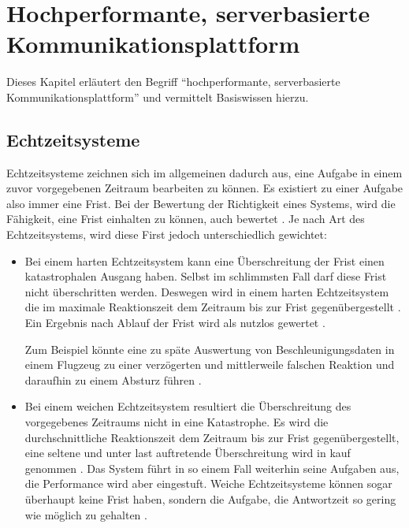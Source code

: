 
\chapter{Hochperformante, serverbasierte Kommunikationsplattform}
\label{com_plattform}

Dieses Kapitel erläutert den Begriff \enquote{hochperformante, serverbasierte Kommunikationsplattform} und vermittelt Basiswissen hierzu.

\section{Echtzeitsysteme}
Echtzeitsysteme zeichnen sich im allgemeinen dadurch aus, eine Aufgabe in einem zuvor vorgegebenen Zeitraum bearbeiten zu können.
Es existiert zu einer Aufgabe also immer eine Frist.
Bei der Bewertung der Richtigkeit eines Systems, wird die Fähigkeit, eine Frist einhalten zu können, auch bewertet \cite[2]{perf:buttazzo2006soft}.
Je nach Art des Echtzeitsystems, wird diese First jedoch unterschiedlich gewichtet:

\begin{itemize}
	\item Bei einem harten Echtzeitsystem kann eine Überschreitung der Frist einen katastrophalen Ausgang haben.
	Selbst im schlimmsten Fall darf diese Frist nicht überschritten werden.
	Deswegen wird in einem harten Echtzeitsystem die im maximale Reaktionszeit dem Zeitraum bis zur Frist gegenübergestellt \cite[75]{douglass2003real}.
	Ein Ergebnis nach Ablauf der Frist wird als nutzlos gewertet \cite[2]{perf:wang2017real}.
	
	Zum Beispiel könnte eine zu späte Auswertung von Beschleunigungsdaten in einem Flugzeug zu einer verzögerten und mittlerweile falschen Reaktion und daraufhin zu einem Absturz führen \cite[5]{perf:laplante2004real}.
	
	\item Bei einem weichen Echtzeitsystem resultiert die Überschreitung des vorgegebenes Zeitraums nicht in eine Katastrophe.
	Es wird die durchschnittliche Reaktionszeit dem Zeitraum bis zur Frist gegenübergestellt, eine seltene und unter last auftretende Überschreitung wird in kauf genommen \cite[76]{douglass2003real}.
	Das System führt in so einem Fall weiterhin seine Aufgaben aus, die Performance wird aber  eingestuft.
	Weiche Echtzeitsysteme können sogar überhaupt keine Frist haben, sondern die Aufgabe, die Antwortzeit so gering wie möglich zu gehalten \cite[4]{perf:buttazzo2006soft}.
\end{itemize}


